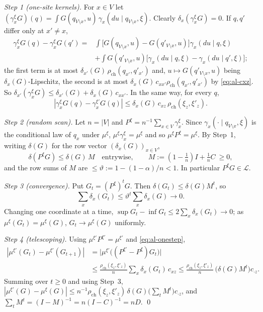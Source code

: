 \documentclass[11pt,a4paper]{article}
\theoremstyle{remark}
\theoremstyle{definition}
\theoremstyle{plain}
\theoremstyle{remark}
\newcommand{\rch}{\rho_{\mathrm{ch}}}
\begin{document}
\emph{Step 1 (one-site kernels).} For $x\in V$ let $(\gamma^\xi_xG)(q)=\int G(q_{V\setminus x},u)\,\gamma_x(du\mid q_{V\setminus x},\xi)$. Clearly $\delta_x(\gamma_x^\xi G)=0$. If $q,q'$ differ only at $x'\ne x$,
\[
\begin{aligned}
\gamma^\xi_xG(q)-\gamma^\xi_xG(q')={}&\int\big[G(q_{V\setminus x},u)-G(q'_{V\setminus x},u)\big]\gamma_x(du\mid q,\xi)\\
&+\int G(q'_{V\setminus x},u)\big[\gamma_x(du\mid q,\xi)-\gamma_x(du\mid q',\xi)\big];
\end{aligned}
\]
the first term is at most $\delta_{x'}(G)\,\rch(q_{x'},q'_{x'})$ and, $u\mapsto G(q'_{V\setminus x},u)$ being $\delta_x(G)$-Lipschitz, the second is at most $\delta_x(G)\,c_{xx'}\rch(q_{x'},q'_{x'})$ by \eqref{eq:al-cxz}. So $\delta_{x'}(\gamma^\xi_xG)\le\delta_{x'}(G)+\delta_x(G)\,c_{xx'}$. In the same way, for every $q$,
\begin{equation}\label{eq:al-onestep}
|\gamma^\xi_xG(q)-\gamma^{\xi'}_xG(q)|\le\delta_x(G)\,c_{xz}\,\rch(\xi_z,\xi'_z).
\end{equation}

\emph{Step 2 (random scan).} Let $n=|V|$ and $P^\xi=n^{-1}\sum_{x\in V}\gamma^\xi_x$. Since $\gamma_x(\cdot\mid q_{V\setminus x},\xi)$ is the conditional law of $q_x$ under $\mu^\xi$, $\mu^\xi\gamma^\xi_x=\mu^\xi$ and so $\mu^\xi P^\xi=\mu^\xi$. By Step~1, writing $\delta(G)$ for the row vector $(\delta_x(G))_{x\in V}$,
\[
\delta(P^\xi G)\le\delta(G)\,M\quad\text{entrywise},\qquad M:=(1-\tfrac1n)I+\tfrac1nC\ \ge0,
\]
and the row sums of $M$ are $\le\vartheta:=1-(1-\alpha)/n<1$. In particular $P^\xi G\in\mathcal L$.

\emph{Step 3 (convergence).} Put $G_t=(P^\xi)^tG$. Then $\delta(G_t)\le\delta(G)M^t$, so
\[
\sum_x\delta_x(G_t)\le\vartheta^t\sum_x\delta_x(G)\to0 .
\]
Changing one coordinate at a time, $\sup G_t-\inf G_t\le2\sum_x\delta_x(G_t)\to0$; as $\mu^\xi(G_t)=\mu^\xi(G)$, $G_t\to\mu^\xi(G)$ uniformly.

\emph{Step 4 (telescoping).} Using $\mu^{\xi'}P^{\xi'}=\mu^{\xi'}$ and \eqref{eq:al-onestep},
\[
\begin{aligned}
|\mu^{\xi'}(G_t)-\mu^{\xi'}(G_{t+1})|&=\big|\mu^{\xi'}\big((P^{\xi'}-P^{\xi})G_t\big)\big|\\
&\le\frac{\rch(\xi_z,\xi'_z)}n\sum_x\delta_x(G_t)\,c_{xz}\le\frac{\rch(\xi_z,\xi'_z)}n\,\big(\delta(G)M^t\big)c_{\cdot z}.
\end{aligned}
\]
Summing over $t\ge0$ and using Step~3, $|\mu^{\xi'}(G)-\mu^\xi(G)|\le n^{-1}\rch(\xi_z,\xi'_z)\,\delta(G)\big(\sum_tM^t\big)c_{\cdot z}$, and $\sum_tM^t=(I-M)^{-1}=n(I-C)^{-1}=nD$. \qed
\end{document}
